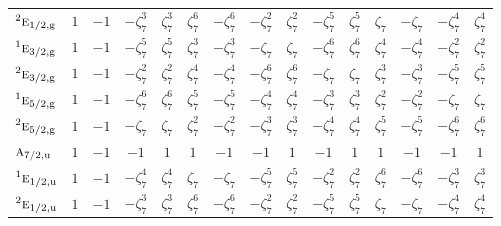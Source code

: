 \documentclass[10pt,a4paper]{article}
\numberwithin{equation}{section}
\newcommand{\irr}[1]{\text{\normalfont\scshape #1}}
\newcommand{\conjpair}[1]{{}^{#1}}
\newcommand{\ptag}[1]{\mathrm{#1}}
\newcommand{\rootunity}[1]{\zeta_{#1}}
\begin{document}
{\begin{longtable}{@{}lcccccccccccccc@{}}
$\conjpair{2}\irr{e}_{1/2,\ptag{g}}$ & $1$ & $-1$ & $-\rootunity{7}^{3}$ & $\rootunity{7}^{3}$ & $\rootunity{7}^{6}$ & $-\rootunity{7}^{6}$ & $-\rootunity{7}^{2}$ & $\rootunity{7}^{2}$ & $-\rootunity{7}^{5}$ & $\rootunity{7}^{5}$ & $\rootunity{7}$ & $-\rootunity{7}$ & $-\rootunity{7}^{4}$ & $\rootunity{7}^{4}$\\
$\conjpair{1}\irr{e}_{3/2,\ptag{g}}$ & $1$ & $-1$ & $-\rootunity{7}^{5}$ & $\rootunity{7}^{5}$ & $\rootunity{7}^{3}$ & $-\rootunity{7}^{3}$ & $-\rootunity{7}$ & $\rootunity{7}$ & $-\rootunity{7}^{6}$ & $\rootunity{7}^{6}$ & $\rootunity{7}^{4}$ & $-\rootunity{7}^{4}$ & $-\rootunity{7}^{2}$ & $\rootunity{7}^{2}$\\
$\conjpair{2}\irr{e}_{3/2,\ptag{g}}$ & $1$ & $-1$ & $-\rootunity{7}^{2}$ & $\rootunity{7}^{2}$ & $\rootunity{7}^{4}$ & $-\rootunity{7}^{4}$ & $-\rootunity{7}^{6}$ & $\rootunity{7}^{6}$ & $-\rootunity{7}$ & $\rootunity{7}$ & $\rootunity{7}^{3}$ & $-\rootunity{7}^{3}$ & $-\rootunity{7}^{5}$ & $\rootunity{7}^{5}$\\
$\conjpair{1}\irr{e}_{5/2,\ptag{g}}$ & $1$ & $-1$ & $-\rootunity{7}^{6}$ & $\rootunity{7}^{6}$ & $\rootunity{7}^{5}$ & $-\rootunity{7}^{5}$ & $-\rootunity{7}^{4}$ & $\rootunity{7}^{4}$ & $-\rootunity{7}^{3}$ & $\rootunity{7}^{3}$ & $\rootunity{7}^{2}$ & $-\rootunity{7}^{2}$ & $-\rootunity{7}$ & $\rootunity{7}$\\
$\conjpair{2}\irr{e}_{5/2,\ptag{g}}$ & $1$ & $-1$ & $-\rootunity{7}$ & $\rootunity{7}$ & $\rootunity{7}^{2}$ & $-\rootunity{7}^{2}$ & $-\rootunity{7}^{3}$ & $\rootunity{7}^{3}$ & $-\rootunity{7}^{4}$ & $\rootunity{7}^{4}$ & $\rootunity{7}^{5}$ & $-\rootunity{7}^{5}$ & $-\rootunity{7}^{6}$ & $\rootunity{7}^{6}$\\
$\irr{a}_{7/2,\ptag{u}}$ & $1$ & $-1$ & $-1$ & $1$ & $1$ & $-1$ & $-1$ & $1$ & $-1$ & $1$ & $1$ & $-1$ & $-1$ & $1$\\
$\conjpair{1}\irr{e}_{1/2,\ptag{u}}$ & $1$ & $-1$ & $-\rootunity{7}^{4}$ & $\rootunity{7}^{4}$ & $\rootunity{7}$ & $-\rootunity{7}$ & $-\rootunity{7}^{5}$ & $\rootunity{7}^{5}$ & $-\rootunity{7}^{2}$ & $\rootunity{7}^{2}$ & $\rootunity{7}^{6}$ & $-\rootunity{7}^{6}$ & $-\rootunity{7}^{3}$ & $\rootunity{7}^{3}$\\
$\conjpair{2}\irr{e}_{1/2,\ptag{u}}$ & $1$ & $-1$ & $-\rootunity{7}^{3}$ & $\rootunity{7}^{3}$ & $\rootunity{7}^{6}$ & $-\rootunity{7}^{6}$ & $-\rootunity{7}^{2}$ & $\rootunity{7}^{2}$ & $-\rootunity{7}^{5}$ & $\rootunity{7}^{5}$ & $\rootunity{7}$ & $-\rootunity{7}$ & $-\rootunity{7}^{4}$ & $\rootunity{7}^{4}$\\

\end{longtable}}
\end{document}
